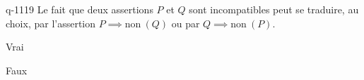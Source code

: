 \begin{truefalse}{q-1119}
Le fait que deux assertions $P$ et $Q$ sont incompatibles peut se traduire, au choix, par l'assertion $P \implies \text{non}\ (Q)$ ou par $Q \implies \text{non}\  (P)$.
\item* Vrai
\item Faux
\end{truefalse}

